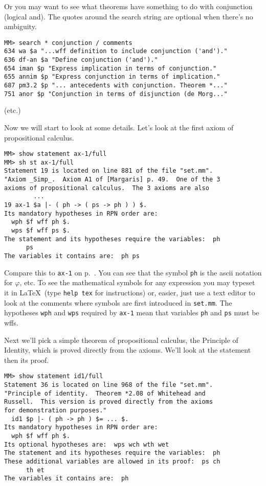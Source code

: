 Or you may want to see what theorems have something to do with
conjunction (logical {\sc and}).  The quotes around the search
string are optional when there's no ambiguity.

\begin{verbatim}
MM> search * conjunction / comments
634 wa $a "...wff definition to include conjunction ('and')."
636 df-an $a "Define conjunction ('and')."
654 iman $p "Express implication in terms of conjunction."
655 annim $p "Express conjunction in terms of implication."
687 pm3.2 $p "... antecedents with conjunction. Theorem *..."
751 anor $p "Conjunction in terms of disjunction (de Morg..."
\end{verbatim}
\begin{center}
(etc.)
\end{center}


Now we will start to look at some details.  Let's look at the first
axiom of propositional calculus.

\begin{verbatim}
MM> show statement ax-1/full
MM> sh st ax-1/full
Statement 19 is located on line 881 of the file "set.mm".
"Axiom _Simp_.  Axiom A1 of [Margaris] p. 49.  One of the 3
axioms of propositional calculus.  The 3 axioms are also
        ...
19 ax-1 $a |- ( ph -> ( ps -> ph ) ) $.
Its mandatory hypotheses in RPN order are:
  wph $f wff ph $.
  wps $f wff ps $.
The statement and its hypotheses require the variables:  ph
      ps
The variables it contains are:  ph ps
\end{verbatim}

Compare this to \texttt{ax-1} on p.~\pageref{ax1}.  You can see that the
symbol \texttt{ph} is the {\sc ascii} notation for $\varphi$, etc.  To
see the mathematical symbols for any expression you may typeset it in
\LaTeX\ (type \texttt{help tex} for instructions)
or, easier, just use a text editor to look at the comments where symbols
are first introduced in \texttt{set.mm}.  The hypotheses \texttt{wph}
and \texttt{wps} required by \texttt{ax-1} mean that variables
\texttt{ph} and \texttt{ps} must be wffs.

Next we'll pick a simple theorem of propositional calculus, the Principle of
Identity, which is proved directly from the axioms.  We'll look at the
statement then its proof.

\begin{verbatim}
MM> show statement id1/full
Statement 36 is located on line 968 of the file "set.mm".
"Principle of identity.  Theorem *2.08 of Whitehead and
Russell.  This version is proved directly from the axioms
for demonstration purposes."
  id1 $p |- ( ph -> ph ) $= ... $.
Its mandatory hypotheses in RPN order are:
  wph $f wff ph $.
Its optional hypotheses are:  wps wch wth wet
The statement and its hypotheses require the variables:  ph
These additional variables are allowed in its proof:  ps ch
      th et
The variables it contains are:  ph
\end{verbatim}

